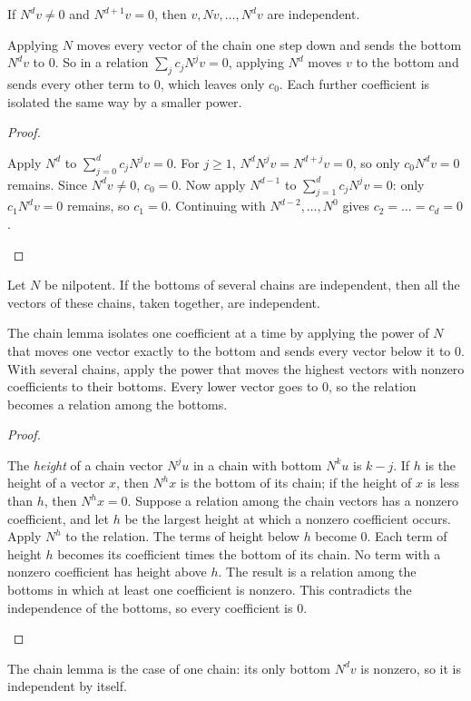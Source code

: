\documentclass[10pt]{scrartcl}
\begin{document}
\begin{proposition*}\hypertarget{name-chain-lemma}{}\label{name-chain-lemma}
  If $N^dv\ne0$ and $N^{d+1}v=0$, then $v,Nv,\dots,N^dv$ are independent.
\end{proposition*}
\begin{ideabox}
Applying $N$ moves every vector of the chain one step down and sends the bottom $N^dv$ to $0$. So in a relation $\sum_{j}c_jN^jv=0$, applying $N^d$ moves $v$ to the bottom and sends every other term to $0$, which leaves only $c_0$. Each further coefficient is isolated the same way by a smaller power.
\end{ideabox}
\begin{proof}
  \begin{steps}
    \ii Apply $N^d$ to $\sum_{j=0}^dc_jN^jv=0$. For $j\ge1$, $N^dN^jv=N^{d+j}v=0$, so only $c_0N^dv=0$ remains. Since $N^dv\ne0$, $c_0=0$.
    \ii Now apply $N^{d-1}$ to $\sum_{j=1}^dc_jN^jv=0$: only $c_1N^dv=0$ remains, so $c_1=0$.
    \ii Continuing with $N^{d-2},\dots,N^0$ gives $c_2=\dots=c_d=0$.
  \end{steps}
\end{proof}

\begin{proposition*}\hypertarget{name-chains-with-independent-bottoms-are-independent}{}\label{name-chains-with-independent-bottoms-are-independent}
  Let $N$ be nilpotent. If the bottoms of several chains are independent, then all the vectors of these chains, taken together, are independent.
\end{proposition*}
\begin{ideabox}
The chain lemma isolates one coefficient at a time by applying the power of $N$ that moves one vector exactly to the bottom and sends every vector below it to $0$. With several chains, apply the power that moves the highest vectors with nonzero coefficients to their bottoms. Every lower vector goes to $0$, so the relation becomes a relation among the bottoms.
\end{ideabox}
\begin{proof}
  \begin{steps}
    \ii The \emph{height} of a chain vector $N^ju$ in a chain with bottom $N^ku$ is $k-j$. If $h$ is the height of a vector $x$, then $N^hx$ is the bottom of its chain; if the height of $x$ is less than $h$, then $N^hx=0$.
    \ii Suppose a relation among the chain vectors has a nonzero coefficient, and let $h$ be the largest height at which a nonzero coefficient occurs.
    \ii Apply $N^h$ to the relation. The terms of height below $h$ become $0$. Each term of height $h$ becomes its coefficient times the bottom of its chain. No term with a nonzero coefficient has height above $h$.
    \ii The result is a relation among the bottoms in which at least one coefficient is nonzero. This contradicts the independence of the bottoms, so every coefficient is $0$.
  \end{steps}
\end{proof}
The chain lemma is the case of one chain: its only bottom $N^dv$ is nonzero, so it is independent by itself.
\end{document}
